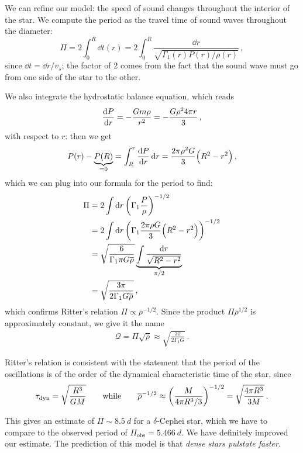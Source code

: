 \documentclass[main.tex]{subfiles}
\begin{document}
We can refine our model: the speed of sound changes throughout the interior of the star.
We compute the period as the travel time of sound waves throughout the diameter:
%
\begin{equation}
  \Pi = 2 \int _{0}   ^{R} \dd{t(r)} = 2 \int_0^R \frac{\dd{r} }{\sqrt{\Gamma_1(r) P(r) / \rho(r)}}\,,
\end{equation}
%
since \(\dd{t} = \dd{r} / v_s\); the factor of 2 comes from the fact that the sound wave must go from one side of the star to the other.

We also integrate the hydrostatic balance equation, which reads 
%
\begin{align}
\dv{P}{r} = - \frac{Gm \rho }{r^2} 
= - \frac{G \rho^2 4 \pi r}{3}
\,,
\end{align}
%
with respect to \(r\): then we get 
%
\begin{align}
P(r) - \underbrace{P(R)}_{=0} = \int_{R}^{r} \dv{P}{r} \dd{r}  = \frac{2 \pi \rho^2 G}{3} \qty(R^2 - r^2)
\,,
\end{align}
%
which we can plug into our formula for the period to find: 
%
\begin{align}
\Pi &= 2 \int \dd{r} \qty(\Gamma_1 \frac{P}{\rho })^{-1/2}  \\
&= 2 \int \dd{r} \qty(\Gamma_1 \frac{2 \pi \rho G}{3} \qty(R^2 - r^2))^{-1/2}  \\
&= \sqrt{\frac{6}{\Gamma_1 \pi G \overline{\rho}}} \underbrace{\int \frac{ \dd{r}}{\sqrt{R^2- r^2}}}_{\pi /2}  \\
&= \sqrt{\frac{3 \pi }{2\Gamma_1 G \overline{\rho} }}
\,,
\end{align}
%
which confirms Ritter's relation \(\Pi \propto \overline{\rho}^{-1/2} \).
Since the product \(\Pi \overline{\rho}^{1/2}\) is approximately constant, we give it the name 
%
\begin{align}
\mathcal{Q} = \Pi \sqrt{\overline{\rho}} \approx 
\sqrt{\frac{3 \pi }{2 \Gamma_1 G}} 
\,.
\end{align}

Ritter's relation is consistent with the statement that the period of the oscillations is of the order of the dynamical characteristic time of the star, since 
%
\begin{align}
\tau _{\text{dyn}} = \sqrt{\frac{R^3}{GM}} \qquad \text{while} \qquad \overline{\rho}^{-1/2} \approx \qty(\frac{M}{4 \pi R^3 / 3})^{-1/2} = \sqrt{\frac{4 \pi R^3}{3M}}
\,.
\end{align}

This gives an estimate of \(\Pi \sim \SI{8.5}{d}\) for a \(\delta \)-Cephei star, which we have to compare to the observed period of \(\Pi _{\text{obs}} = \SI{5.466}{d}\). We have definitely improved our estimate. 
The prediction of this model is that \emph{dense stars pulstate faster}. 
\end{document}
